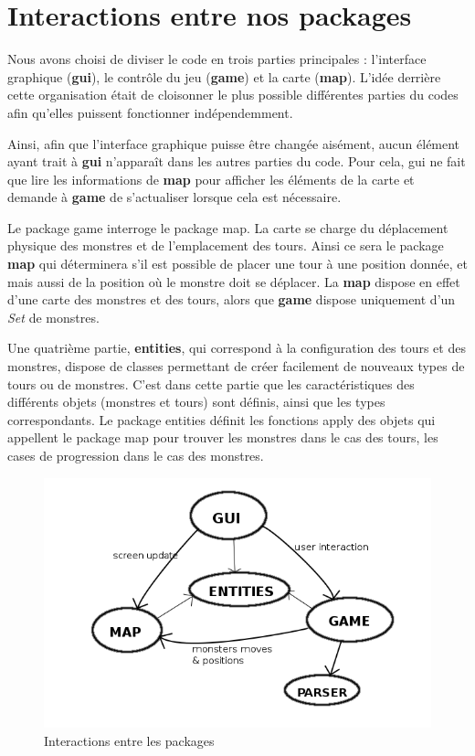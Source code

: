 \documentclass{article}
\begin{document}
\section{Interactions entre nos packages}
Nous avons choisi de diviser le code en trois parties principales : l'interface graphique (\textbf{gui}), le contrôle du jeu (\textbf{game}) et la carte (\textbf{map}). L'idée derrière cette organisation était de cloisonner le plus possible différentes parties du codes afin qu'elles puissent fonctionner indépendemment. 
\par
Ainsi, afin que l'interface graphique puisse être changée aisément, aucun élément ayant trait à \textbf{gui} n'apparaît dans les autres parties du code. Pour cela, gui ne fait que lire les informations de \textbf{map} pour afficher les éléments de la carte et demande à \textbf{game} de s'actualiser lorsque cela est nécessaire. 
\par
Le package game interroge le package map. La carte se charge du déplacement physique des monstres et de l'emplacement des tours. Ainsi ce sera le package \textbf{map} qui déterminera s'il est possible de placer une tour à une position donnée, et mais aussi de la position où le monstre doit se déplacer. La \textbf{map} dispose en effet d'une carte des monstres et des tours, alors que \textbf{game} dispose uniquement d'un \textit{Set} de monstres. 
\par
Une quatrième partie, \textbf{entities}, qui correspond à la configuration des tours et des monstres, dispose de classes permettant de créer facilement de nouveaux types de tours ou de monstres. C'est dans cette partie que les caractéristiques des différents objets (monstres et tours) sont définis, ainsi que les types correspondants. Le package entities définit les fonctions apply des objets qui appellent le package map pour trouver les monstres dans le cas des tours, les cases de progression dans le cas des monstres.


\begin{figure}[h]
\center
\includegraphics[scale = 0.4]{interactions.png}
\caption{Interactions entre les packages}
\end{figure}
\end{document}
